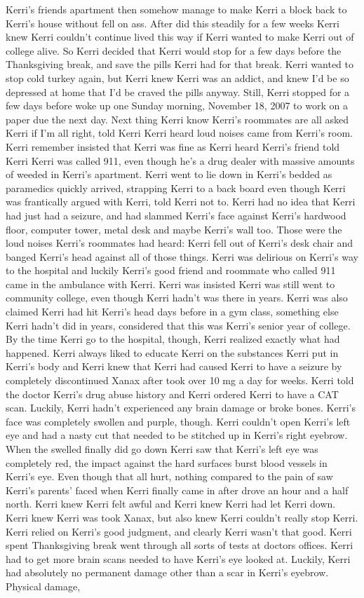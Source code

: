 \documentclass[12pt]{book}
\begin{document}
Kerri's friends apartment then somehow manage to make Kerri a block back to Kerri's house without fell on ass. After did this steadily for a few weeks Kerri knew Kerri couldn't continue lived this way if Kerri wanted to make Kerri out of college alive. So Kerri decided that Kerri would stop for a few days before the Thanksgiving break, and save the pills Kerri had for that break. Kerri wanted to stop cold turkey again, but Kerri knew Kerri was an addict, and knew I'd be so depressed at home that I'd be craved the pills anyway. Still, Kerri stopped for a few days before woke up one Sunday morning, November 18, 2007 to work on a paper due the next day. Next thing Kerri know Kerri's roommates are all asked Kerri if I'm all right, told Kerri Kerri heard loud noises came from Kerri's room. Kerri remember insisted that Kerri was fine as Kerri heard Kerri's friend told Kerri Kerri was called 911, even though he's a drug dealer with massive amounts of weeded in Kerri's apartment. Kerri went to lie down in Kerri's bedded as paramedics quickly arrived, strapping Kerri to a back board even though Kerri was frantically argued with Kerri, told Kerri not to. Kerri had no idea that Kerri had just had a seizure, and had slammed Kerri's face against Kerri's hardwood floor, computer tower, metal desk and maybe Kerri's wall too. Those were the loud noises Kerri's roommates had heard: Kerri fell out of Kerri's desk chair and banged Kerri's head against all of those things. Kerri was delirious on Kerri's way to the hospital and luckily Kerri's good friend and roommate who called 911 came in the ambulance with Kerri. Kerri was insisted Kerri was still went to community college, even though Kerri hadn't was there in years. Kerri was also claimed Kerri had hit Kerri's head days before in a gym class, something else Kerri hadn't did in years, considered that this was Kerri's senior year of college. By the time Kerri go to the hospital, though, Kerri realized exactly what had happened. Kerri always liked to educate Kerri on the substances Kerri put in Kerri's body and Kerri knew that Kerri had caused Kerri to have a seizure by completely discontinued Xanax after took over 10 mg a day for weeks. Kerri told the doctor Kerri's drug abuse history and Kerri ordered Kerri to have a CAT scan. Luckily, Kerri hadn't experienced any brain damage or broke bones. Kerri's face was completely swollen and purple, though. Kerri couldn't open Kerri's left eye and had a nasty cut that needed to be stitched up in Kerri's right eyebrow. When the swelled finally did go down Kerri saw that Kerri's left eye was completely red, the impact against the hard surfaces burst blood vessels in Kerri's eye. Even though that all hurt, nothing compared to the pain of saw Kerri's parents' faced when Kerri finally came in after drove an hour and a half north. Kerri knew Kerri felt awful and Kerri knew Kerri had let Kerri down. Kerri knew Kerri was took Xanax, but also knew Kerri couldn't really stop Kerri. Kerri relied on Kerri's good judgment, and clearly Kerri wasn't that good. Kerri spent Thanksgiving break went through all sorts of tests at doctors offices. Kerri had to get more brain scans needed to have Kerri's eye looked at. Luckily, Kerri had absolutely no permanent damage other than a scar in Kerri's eyebrow. Physical damage, 
\end{document}
